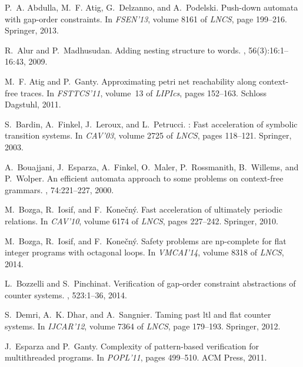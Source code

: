 \documentclass[final]{llncs}
\begin{document}

\begin{thebibliography}{10}

P.~A. Abdulla, M.~F. Atig, G.~Delzanno, and A.~Podelski.
\newblock Push-down automata with gap-order constraints.
\newblock In {\em FSEN'13}, volume 8161 of {\em LNCS}, page 199–216.
  Springer, 2013.

R.~Alur and P.~Madhusudan.
\newblock Adding nesting structure to words.
, 56(3):16:1--16:43, 2009.

M.~F. Atig and P.~Ganty.
\newblock Approximating petri net reachability along context-free traces.
\newblock In {\em FSTTCS'11}, volume~13 of {\em LIPIcs}, pages 152--163.
  Schloss Dagstuhl, 2011.

S.~Bardin, A.~Finkel, J.~Leroux, and L.~Petrucci.
: Fast acceleration of symbolic transition systems.
\newblock In {\em CAV'03}, volume 2725 of {\em LNCS}, pages 118--121.
  Springer, 2003.

A.~Bouajjani, J.~Esparza, A.~Finkel, O.~Maler, P.~Rossmanith, B.~Willems, and
  P.~Wolper.
\newblock An efficient automata approach to some problems on context-free
  grammars.
, 74:221--227, 2000.

M.~Bozga, R.~Iosif, and F.~Kone\v{c}n\'{y}.
\newblock Fast acceleration of ultimately periodic relations.
\newblock In {\em CAV'10}, volume 6174 of {\em LNCS}, pages 227--242.
  Springer, 2010.

M.~Bozga, R.~Iosif, and F.~Kone\v{c}n\'{y}.
\newblock Safety problems are np-complete for flat integer programs with
  octagonal loops.
\newblock In {\em VMCAI'14}, volume 8318 of {\em LNCS}, 2014.

L.~Bozzelli and S.~Pinchinat.
\newblock Verification of gap-order constraint abstractions of counter systems.
, 523:1–36, 2014.

S.~Demri, A.~K. Dhar, and A.~Sangnier.
\newblock Taming past ltl and flat counter systems.
\newblock In {\em IJCAR'12}, volume 7364 of {\em LNCS}, page 179–193.
  Springer, 2012.

J.~Esparza and P.~Ganty.
\newblock Complexity of pattern-based verification for multithreaded programs.
\newblock In {\em POPL'11}, pages 499--510. ACM Press, 2011.


\end{thebibliography}
\end{document}
